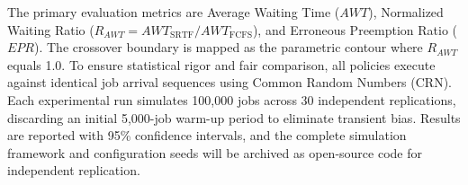\documentclass[11pt]{article}
\begin{document}
{{The primary evaluation metrics are Average Waiting Time ($AWT$), Normalized Waiting Ratio ($R_{AWT} = AWT_{\text{SRTF}} / AWT_{\text{FCFS}}$), and Erroneous Preemption Ratio ($EPR$). The crossover boundary is mapped as the parametric contour where $R_{AWT}$ equals 1.0. To ensure statistical rigor and fair comparison, all policies execute against identical job arrival sequences using Common Random Numbers (CRN). Each experimental run simulates 100,000 jobs across 30 independent replications, discarding an initial 5,000-job warm-up period to eliminate transient bias. Results are reported with 95\% confidence intervals, and the complete simulation framework and configuration seeds will be archived as open-source code for independent replication.
\vspace{0.2em}%
}%
}

\vspace{0.4em}
\end{document}

